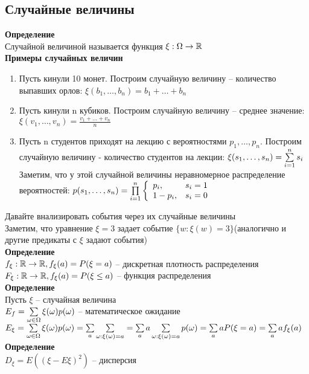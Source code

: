 \documentclass[12pt]{article}
\begin{document}
\subsection{Случайные величины}
\textbf{Определение}\\
Случайной величиной называется функция $\xi: \Omega \rightarrow \mathbb{R}$\\
\textbf{Примеры случайных величин}
\begin{enumerate}
    \item Пусть кинули 10 монет. Построим случайную величину -- количество выпавших орлов: $\xi(b_1,\ldots,b_n)=b_1+\ldots+b_n$
    \item Пусть кинули n кубиков. Построим случайную величину -- среднее значение: $\xi(v_1,\ldots,v_n)=\frac{v_1+\ldots+v_n}n$
    \item Пусть n студентов приходят на лекцию с вероятностями $p_1, \ldots, p_n$. Построим случайную величину - количество студентов на лекции: $\xi(s_1, \ldots, s_n) = \sum\limits_{i=1}^ns_i$\\
    Заметим, что у этой случайной величины неравномерное распределение вероятностей: $p(s_1,\ldots,s_n) = \prod\limits_{i=1}^n \left\{\begin{array}{ll}
         p_i, & s_i = 1\\
         1-p_i, & s_i = 0
    \end{array}\right.$
\end{enumerate}
Давайте внализировать события через их случайные величины\\
Заметим, что уравнение $\xi = 3$ задает событие $\{w: \xi(w) = 3\}$(аналогично и другие предикаты с $\xi$ задают события)\\
\textbf{Определение}\\
$f_\xi: \mathbb{R} \rightarrow \mathbb{R}, f_\xi(a) = P(\xi = a)$ -- дискретная плотность распределения\\
$F_\xi: \mathbb{R} \rightarrow \mathbb{R}, f_\xi(a) = P(\xi \leq a)$ -- функция распределения\\
\textbf{Определение}\\
Пусть $\xi$ -- случайная величина\\
$E_f = \sum\limits_{\omega \in \Omega} \xi(\omega)p(\omega)$ -- математическое ожидание\\
$E_\xi = \sum\limits_{\omega \in \Omega}\xi(\omega)p(\omega) = \sum\limits_a\sum\limits_{\omega: \xi(\omega) = a} = \sum\limits_a a\sum\limits_{\omega: \xi(\omega)=a} p(\omega) = \sum\limits_a aP(\xi = a) = \sum\limits_a af_\xi(a)$\\
\textbf{Определение}\\
$D_\xi = E((\xi-E\xi)^2)$ -- дисперсия\\
\end{document}
